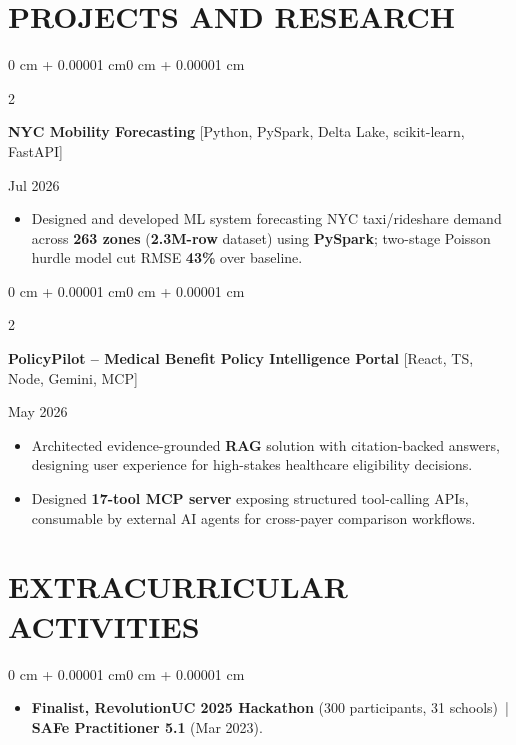 \documentclass[10pt, letterpaper]{article}
\newenvironment{highlights}{
    \begin{itemize}[
        topsep=0.10 cm,
        parsep=0.06 cm,
        partopsep=0pt,
        itemsep=0.06 cm,
        leftmargin=12pt
    ]
}{
    \end{itemize}
}
\newenvironment{onecolentry}{
    \begin{adjustwidth}{0 cm + 0.00001 cm}{0 cm + 0.00001 cm}
}{
    \end{adjustwidth}
}
\newenvironment{twocolentry}[2][]{
    \onecolentry
    \def\secondColumn{#2}
    \setcolumnwidth{\fill, 4.5 cm}
    \begin{paracol}{2}
}{
    \switchcolumn \raggedleft \secondColumn
    \end{paracol}
    \endonecolentry
}
\begin{document}
\section{PROJECTS AND RESEARCH}
\begin{twocolentry}{Jul 2026}
\textbf{NYC Mobility Forecasting} [Python, PySpark, Delta Lake, scikit-learn, FastAPI]
\end{twocolentry}
\begin{highlights}
  \item Designed and developed ML system forecasting NYC taxi/rideshare demand across \textbf{263 zones} (\textbf{2.3M-row} dataset) using \textbf{PySpark}; two-stage Poisson hurdle model cut RMSE \textbf{43\%} over baseline.
\end{highlights}

\vspace{0.12 cm}

\begin{twocolentry}{May 2026}
\textbf{PolicyPilot -- Medical Benefit Policy Intelligence Portal} [React, TS, Node, Gemini, MCP]
\end{twocolentry}
\begin{highlights}
  \item Architected evidence-grounded \textbf{RAG} solution with citation-backed answers, designing user experience for high-stakes healthcare eligibility decisions.
  \item Designed \textbf{17-tool MCP server} exposing structured tool-calling APIs, consumable by external AI agents for cross-payer comparison workflows.
\end{highlights}

\section{EXTRACURRICULAR ACTIVITIES}
\begin{onecolentry}
\begin{highlights}
  \item \textbf{Finalist, RevolutionUC 2025 Hackathon} (300 participants, 31 schools) \,|\, \textbf{SAFe Practitioner 5.1} (Mar 2023).
\end{highlights}
\end{onecolentry}
\end{document}
